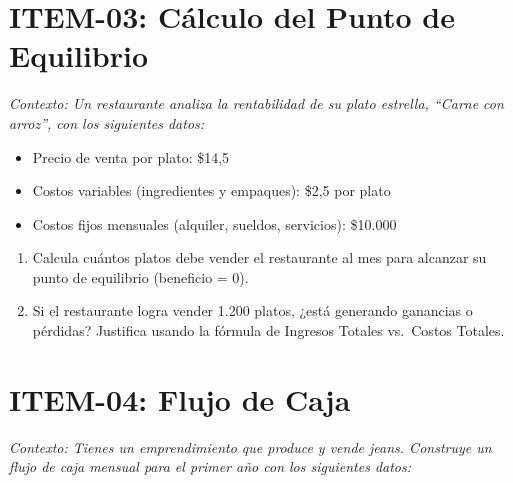\documentclass[12pt,a4paper]{article}
\newcommand{\answerspace}{\vspace{4.5cm}}
\newcommand{\lastanswerspace}{\vspace{2cm}}
\begin{document}
\section{ITEM-03: Cálculo del Punto de Equilibrio}

\noindent\textit{Contexto: Un restaurante analiza la rentabilidad de su plato estrella, ``Carne con arroz'', con los siguientes datos:}

\vspace{0.4em}
\begin{itemize}[leftmargin=2cm, itemsep=2pt]
  \item Precio de venta por plato: \$14,5
  \item Costos variables (ingredientes y empaques): \$2,5 por plato
  \item Costos fijos mensuales (alquiler, sueldos, servicios): \$10.000
\end{itemize}
\vspace{0.4em}

\begin{enumerate}[label=\textbf{\arabic*.}, leftmargin=*, itemsep=0pt]

\item Calcula cuántos platos debe vender el restaurante al mes para alcanzar su punto de equilibrio (beneficio = 0).
\answerspace

\item Si el restaurante logra vender 1.200 platos, ¿está generando ganancias o pérdidas? Justifica usando la fórmula de Ingresos Totales vs.\ Costos Totales.
\lastanswerspace

\end{enumerate}

\newpage

\section{ITEM-04: Flujo de Caja}

\noindent\textit{Contexto: Tienes un emprendimiento que produce y vende jeans. Construye un flujo de caja mensual para el primer año con los siguientes datos:}
\end{document}
